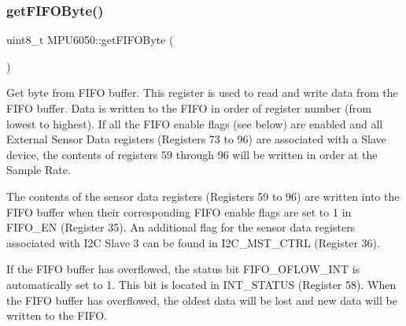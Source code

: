 \begin{DoxyCode}{0}

\end{DoxyCode}
\mbox{\label{classMPU6050_a7733011d30d5b64564f6b5422d8639ae}} 
\subsubsection{\texorpdfstring{getFIFOByte()}{getFIFOByte()}}
{\footnotesize\ttfamily uint8\+\_\+t M\+P\+U6050\+::get\+F\+I\+F\+O\+Byte (\begin{DoxyParamCaption}{ }\end{DoxyParamCaption})}

Get byte from F\+I\+FO buffer. This register is used to read and write data from the F\+I\+FO buffer. Data is written to the F\+I\+FO in order of register number (from lowest to highest). If all the F\+I\+FO enable flags (see below) are enabled and all External Sensor Data registers (Registers 73 to 96) are associated with a Slave device, the contents of registers 59 through 96 will be written in order at the Sample Rate.

The contents of the sensor data registers (Registers 59 to 96) are written into the F\+I\+FO buffer when their corresponding F\+I\+FO enable flags are set to 1 in F\+I\+F\+O\+\_\+\+EN (Register 35). An additional flag for the sensor data registers associated with I2C Slave 3 can be found in I2\+C\+\_\+\+M\+S\+T\+\_\+\+C\+T\+RL (Register 36).

If the F\+I\+FO buffer has overflowed, the status bit F\+I\+F\+O\+\_\+\+O\+F\+L\+O\+W\+\_\+\+I\+NT is automatically set to 1. This bit is located in I\+N\+T\+\_\+\+S\+T\+A\+T\+US (Register 58). When the F\+I\+FO buffer has overflowed, the oldest data will be lost and new data will be written to the F\+I\+FO.

